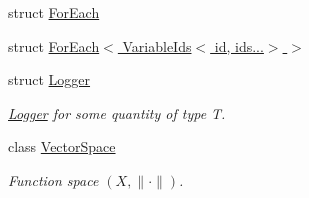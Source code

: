 \begin{DoxyCompactItemize}
struct \hyperlink{structSpacy_1_1ForEach}{For\-Each}
\item 
struct \hyperlink{structSpacy_1_1ForEach_3_01VariableIds_3_01id_00_01ids_8_8_8_4_01_4}{For\-Each$<$ Variable\-Ids$<$ id, ids...$>$ $>$}
\item 
struct \hyperlink{structSpacy_1_1Logger}{Logger}
\begin{DoxyCompactList}\small\item\em \hyperlink{structSpacy_1_1Logger}{Logger} for some quantity of type T. \end{DoxyCompactList}\item 
class \hyperlink{classSpacy_1_1VectorSpace}{Vector\-Space}
\begin{DoxyCompactList}\small\item\em Function space $(X,\|\cdot\|)$. \end{DoxyCompactList}\end{DoxyCompactItemize}
